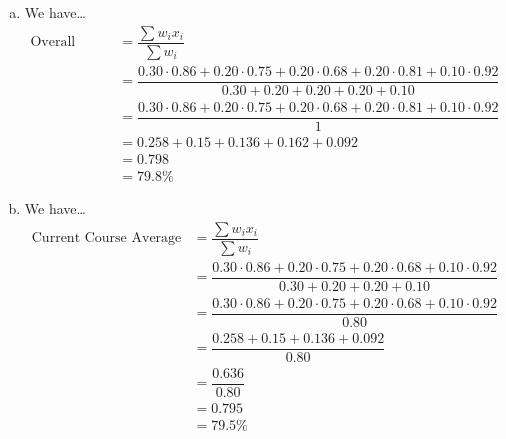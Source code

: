 \documentclass[11pt,letterpaper]{article}
\begin{document}
\sol 
\begin{enumerate}[(a)]
\item We have\dots
	\[
	\begin{aligned}
	\text{Overall Course Average}&= \dfrac{\sum w_i x_i}{\sum w_i} \\[0.3cm]
	&= \dfrac{0.30 \cdot 0.86 + 0.20 \cdot 0.75 + 0.20 \cdot 0.68 + 0.20 \cdot 0.81 + 0.10 \cdot 0.92}{0.30 + 0.20 + 0.20 + 0.20 + 0.10} \\[0.3cm]
	&= \dfrac{0.30 \cdot 0.86 + 0.20 \cdot 0.75 + 0.20 \cdot 0.68 + 0.20 \cdot 0.81 + 0.10 \cdot 0.92}{1} \\[0.3cm]
	&= 0.258 + 0.15 + 0.136 + 0.162 + 0.092 \\[0.3cm]
	&= 0.798 \\[0.3cm]
	&= 79.8\%
	\end{aligned}
	\] \pspace

\item We have\dots
	\[
	\begin{aligned}
	\text{Current Course Average}&= \dfrac{\sum w_i x_i}{\sum w_i} \\[0.3cm]
	&= \dfrac{0.30 \cdot 0.86 + 0.20 \cdot 0.75 + 0.20 \cdot 0.68 + 0.10 \cdot 0.92}{0.30 + 0.20 + 0.20 + 0.10} \\[0.3cm]
	&= \dfrac{0.30 \cdot 0.86 + 0.20 \cdot 0.75 + 0.20 \cdot 0.68 + 0.10 \cdot 0.92}{0.80} \\[0.3cm]
	&= \dfrac{0.258 + 0.15 + 0.136 + 0.092}{0.80} \\[0.3cm]
	&= \dfrac{0.636}{0.80} \\[0.3cm]
	&= 0.795 \\[0.3cm]
	&= 79.5\%
	\end{aligned}
	\]  
\end{enumerate}



\newpage
\end{document}
